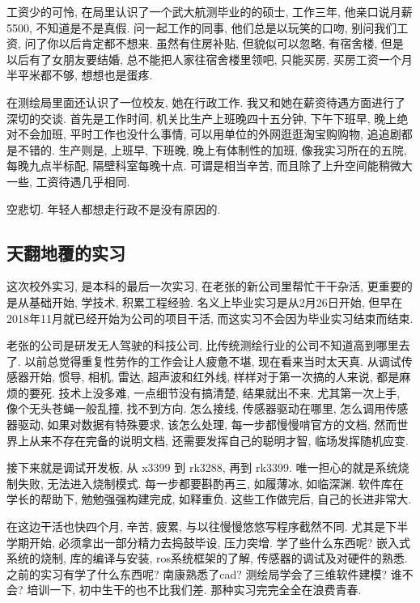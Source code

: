 \documentclass[a4paper, UTF8,  12pt]{article}
\begin{document}
工资少的可怜, 在局里认识了一个武大航测毕业的的硕士, 工作三年, 他亲口说月薪5500, 不知道是不是真假. 问一起工作的同事, 他们总是以玩笑的口吻, 别问我们工资, 问了你以后肯定都不想来. 虽然有住房补贴, 但貌似可以忽略, 有宿舍楼, 但是以后有了女朋友要结婚, 总不能把人家往宿舍楼里领吧, 只能买房, 买房工资一个月半平米都不够, 想想也是蛋疼. 

在测绘局里面还认识了一位校友, 她在行政工作. 我又和她在薪资待遇方面进行了深切的交谈. 首先是工作时间, 机关比生产上班晚四十五分钟, 下午下班早, 晚上绝对不会加班, 平时工作也没什么事情, 可以用单位的外网逛逛淘宝购购物, 追追剧都是不错的. 生产则是, 上班早, 下班晚, 晚上有体制性的加班, 像我实习所在的五院, 每晚九点半标配, 隔壁科室每晚十点. 可谓是相当辛苦, 而且除了上升空间能稍微大一些, 工资待遇几乎相同. 

空悲切. 年轻人都想走行政不是没有原因的.

\subsection{天翻地覆的实习}

这次校外实习, 是本科的最后一次实习, 在老张的新公司里帮忙干干杂活, 更重要的是从基础开始, 学技术, 积累工程经验. 名义上毕业实习是从2月26日开始, 但早在2018年11月就已经开始为公司的项目干活, 而这实习不会因为毕业实习结束而结束.

老张的公司是研发无人驾驶的科技公司, 比传统测绘行业的公司不知道高到哪里去了. 以前总觉得重复性劳作的工作会让人疲惫不堪, 现在看来当时太天真. 从调试传感器开始, 惯导, 相机, 雷达, 超声波和红外线, 样样对于第一次搞的人来说, 都是麻烦的要死. 技术上没多难, 一点细节没有搞清楚, 结果就出不来. 尤其第一次上手, 像个无头苍蝇一般乱撞, 找不到方向. 怎么接线, 传感器驱动在哪里, 怎么调用传感器驱动, 如果对数据有特殊要求, 该怎么处理, 每一步都慢慢啃官方的文档, 然而世界上从来不存在完备的说明文档, 还需要发挥自己的聪明才智, 临场发挥随机应变.

接下来就是调试开发板, 从 x3399 到 rk3288, 再到 rk3399. 唯一担心的就是系统烧制失败, 无法进入烧制模式. 每一步都要斟酌再三, 如履薄冰, 如临深渊. 软件库在学长的帮助下, 勉勉强强构建完成, 如释重负. 这些工作做完后, 自己的长进非常大. 

在这边干活也快四个月, 辛苦, 疲累, 与以往慢慢悠悠写程序截然不同. 尤其是下半学期开始, 必须拿出一部分精力去捣鼓毕设, 压力突增. 学了些什么东西呢? 嵌入式系统的烧制, 库的编译与安装, ros系统框架的了解, 传感器的调试及对硬件的熟悉. 之前的实习有学了什么东西呢? 南康熟悉了cad? 测绘局学会了三维软件建模? 谁不会? 培训一下, 初中生干的也不比我们差. 那种实习完完全全在浪费青春. 
\end{document}
